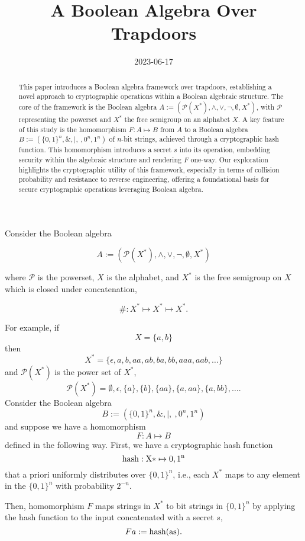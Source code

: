 \documentclass[
]{article}
\title{A Boolean Algebra Over Trapdoors}
\author{}
\date{\vspace{-2.5em}2023-06-17}
\begin{document}
\maketitle
\begin{abstract}
This paper introduces a Boolean algebra framework over trapdoors,
establishing a novel approach to cryptographic operations within a
Boolean algebraic structure. The core of the framework is the Boolean
algebra \(A := (\mathcal{P}(X^*), \land, \lor, \neg, \emptyset, X^*)\),
with \(\mathcal{P}\) representing the powerset and \(X^*\) the free
semigroup on an alphabet \(X\). A key feature of this study is the
homomorphism \(F : A \mapsto B\) from \(A\) to a Boolean algebra
\(B := (\{0,1\}^n, \&, |, ~, 0^n, 1^n)\) of \(n\)-bit strings, achieved
through a cryptographic hash function. This homomorphism introduces a
secret \(s\) into its operation, embedding security within the algebraic
structure and rendering \(F\) one-way. Our exploration highlights the
cryptographic utility of this framework, especially in terms of
collision probability and resistance to reverse engineering, offering a
foundational basis for secure cryptographic operations leveraging
Boolean algebra.
\end{abstract}

{
\setcounter{tocdepth}{2}
\tableofcontents
}
\newtheorem{theorem}{Theorem}

Consider the Boolean algebra

\[
    A := (\mathcal{P}(X^*), \land, \lor, \neg, \emptyset, X^*)
\]

where \(\mathcal{P}\) is the powerset, \(X\) is the alphabet, and
\(X^*\) is the free semigroup on \(X\) which is closed under
concatenation,

\[
    \# : X^* \mapsto X^* \mapsto X^*.
\]

For example, if \[
    X = \{a,b\}
\] then \[
    X^* = \{\epsilon, a, b, aa, ab, ba, bb, aaa, aab, \ldots \}
\] and \(\mathcal{P}(X^*)\) is the power set of \(X^*\), \[
    \mathcal{P}(X^*) = {\emptyset, \epsilon, \{a\}, \{b\},
             \{aa\}, \{a,aa\}, \{a,bb\}, \ldots }.
\] Consider the Boolean algebra \[
    B := (\{0,1\}^n, \&, |, ~, 0^n, 1^n)
\] and suppose we have a homomorphism \[
    F : A \mapsto B
\] defined in the following way. First, we have a cryptographic hash
function \[
    \rm{hash} : X* \mapsto {0,1}^n
\] that a priori uniformly distributes over \(\{0,1\}^n\), i.e., each
\(X^*\) maps to any element in the \(\{0,1\}^n\) with probability
\(2^{-n}\).

Then, homomorphism \(F\) maps strings in \(X^*\) to bit strings in
\(\{0,1\}^n\) by applying the hash function to the input concatenated
with a secret \(s\), \[
    F a := \rm{hash}(a s).
\]
\end{document}
